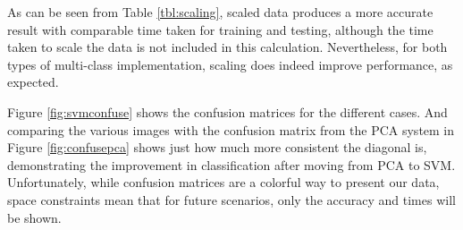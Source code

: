 \documentclass[a4paper, 10pt, conference]{ieeeconf}
\begin{document}
As can be seen from Table \ref{tbl:scaling}, scaled data produces a more accurate result with comparable time taken for training and testing, although the time taken to scale the data is not included in this calculation. Nevertheless, for both types of multi-class implementation, scaling does indeed improve performance, as expected.

Figure \ref{fig:svmconfuse} shows the confusion matrices for the different cases. And comparing the various images with the confusion matrix from the PCA system in Figure \ref{fig:confusepca} shows just how much more consistent the diagonal is, demonstrating the improvement in classification after moving from PCA to SVM. Unfortunately, while confusion matrices are a colorful way to present our data, space constraints mean that for future scenarios, only the accuracy and times will be shown.
\end{document}
